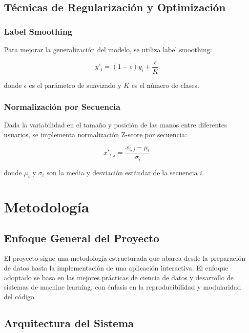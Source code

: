 \documentclass[12pt,a4paper]{article}
\begin{document}
\subsection{Técnicas de Regularización y Optimización}

\subsubsection{Label Smoothing}

Para mejorar la generalización del modelo, se utiliza label smoothing:

\begin{equation}
y'_i = (1 - \epsilon) y_i + \frac{\epsilon}{K}
\end{equation}

donde $\epsilon$ es el parámetro de suavizado y $K$ es el número de clases.

\subsubsection{Normalización por Secuencia}

Dada la variabilidad en el tamaño y posición de las manos entre diferentes usuarios, se implementa normalización Z-score por secuencia:

\begin{equation}
x'_{i,j} = \frac{x_{i,j} - \mu_i}{\sigma_i}
\end{equation}

donde $\mu_i$ y $\sigma_i$ son la media y desviación estándar de la secuencia $i$.

\section{Metodología}

\subsection{Enfoque General del Proyecto}

El proyecto sigue una metodología estructurada que abarca desde la preparación de datos hasta la implementación de una aplicación interactiva. El enfoque adoptado se basa en las mejores prácticas de ciencia de datos y desarrollo de sistemas de machine learning, con énfasis en la reproducibilidad y modularidad del código.

\subsection{Arquitectura del Sistema}
\end{document}
